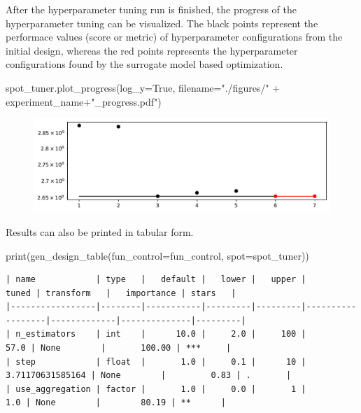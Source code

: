 \documentclass[
  letterpaper,
  DIV=11,
  numbers=noendperiod]{scrreprt}
\newenvironment{Shaded}{\begin{snugshade}}{\end{snugshade}}
\newcommand{\BuiltInTok}[1]{\textcolor[rgb]{0.00,0.23,0.31}{#1}}
\newcommand{\NormalTok}[1]{\textcolor[rgb]{0.00,0.23,0.31}{#1}}
\newcommand{\OperatorTok}[1]{\textcolor[rgb]{0.37,0.37,0.37}{#1}}
\newcommand{\StringTok}[1]{\textcolor[rgb]{0.13,0.47,0.30}{#1}}
\newcommand{\VariableTok}[1]{\textcolor[rgb]{0.07,0.07,0.07}{#1}}
\begin{document}
After the hyperparameter tuning run is finished, the progress of the
hyperparameter tuning can be visualized. The black points represent the
performace values (score or metric) of hyperparameter configurations
from the initial design, whereas the red points represents the
hyperparameter configurations found by the surrogate model based
optimization.

\begin{Shaded}
\begin{Highlighting}[]
\NormalTok{spot\_tuner.plot\_progress(log\_y}\OperatorTok{=}\VariableTok{True}\NormalTok{, filename}\OperatorTok{=}\StringTok{"./figures/"} \OperatorTok{+}\NormalTok{ experiment\_name}\OperatorTok{+}\StringTok{"\_progress.pdf"}\NormalTok{)}
\end{Highlighting}
\end{Shaded}

\begin{figure}[H]

{\centering \includegraphics{025_spot_hpt_river_friedman_amfr_files/figure-pdf/cell-21-output-1.pdf}

}

\end{figure}

Results can also be printed in tabular form.

\begin{Shaded}
\begin{Highlighting}[]
\BuiltInTok{print}\NormalTok{(gen\_design\_table(fun\_control}\OperatorTok{=}\NormalTok{fun\_control, spot}\OperatorTok{=}\NormalTok{spot\_tuner))}
\end{Highlighting}
\end{Shaded}

\begin{verbatim}
| name            | type   |   default |   lower |   upper |            tuned | transform   |   importance | stars   |
|-----------------|--------|-----------|---------|---------|------------------|-------------|--------------|---------|
| n_estimators    | int    |      10.0 |     2.0 |     100 |             57.0 | None        |       100.00 | ***     |
| step            | float  |       1.0 |     0.1 |      10 | 3.71170631585164 | None        |         0.83 | .       |
| use_aggregation | factor |       1.0 |     0.0 |       1 |              1.0 | None        |        80.19 | **      |
\end{verbatim}
\end{document}
